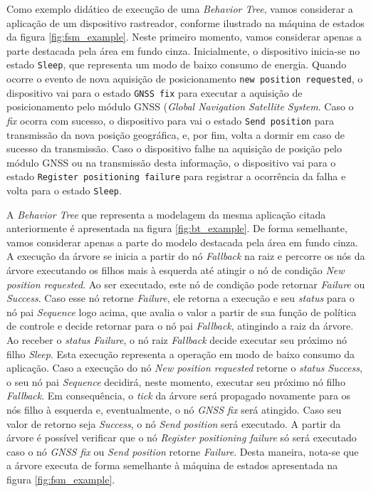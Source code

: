 \documentclass[conference]{IEEEtran}
\begin{document}
Como exemplo didático de execução de uma \textit{Behavior Tree}, vamos considerar a aplicação de um dispositivo rastreador, conforme ilustrado na máquina de estados da figura \ref{fig:fsm_example}.
Neste primeiro momento, vamos considerar apenas a parte destacada pela área em fundo cinza. Inicialmente, o dispositivo inicia-se no estado \texttt{Sleep}, que representa um modo de baixo consumo de energia.
Quando ocorre o evento de nova aquisição de posicionamento \texttt{new position requested}, o dispositivo vai para o estado \texttt{GNSS fix} para executar a aquisição de posicionamento pelo módulo GNSS (\textit{Global Navigation Satellite System}.
Caso o \textit{fix} ocorra com sucesso, o dispositivo para vai o estado \texttt{Send position} para transmissão da nova posição geográfica, e, por fim, volta a dormir em caso de sucesso da transmissão.
Caso o dispositivo falhe na aquisição de posição pelo módulo GNSS ou na transmissão desta informação, o dispositivo vai para o estado \texttt{Register positioning failure} para registrar a ocorrência da falha e volta para o estado \texttt{Sleep}.

A \textit{Behavior Tree} que representa a modelagem da mesma aplicação citada anteriormente é apresentada na figura \ref{fig:bt_example}.
De forma semelhante, vamos considerar apenas a parte do modelo destacada pela área em fundo cinza. A execução da árvore se inicia a partir do nó \textit{Fallback} na raiz e percorre os nós da árvore executando os filhos mais à esquerda até atingir o nó de condição \textit{New position requested}. Ao ser executado, este nó de condição pode retornar \textit{Failure} ou \textit{Success}.
Caso esse nó retorne \textit{Failure}, ele retorna a execução e seu \textit{status} para o nó pai \textit{Sequence} logo acima, que avalia o valor a partir de sua função de política de controle e decide retornar para o nó pai \textit{Fallback}, atingindo a raiz da árvore.
Ao receber o \textit{status} \textit{Failure}, o nó raiz \textit{Fallback} decide executar seu próximo nó filho \textit{Sleep}.
Esta execução representa a operação em modo de baixo consumo da aplicação.
Caso a execução do nó \textit{New position requested} retorne o \textit{status} \textit{Success}, o seu nó pai \textit{Sequence} decidirá, neste momento, executar seu próximo nó filho \textit{Fallback}.
Em consequência, o \textit{tick} da árvore será propagado novamente para os nós filho à esquerda e, eventualmente, o nó \textit{GNSS fix} será atingido.
Caso seu valor de retorno seja \textit{Success}, o nó \textit{Send position} será executado. A partir da árvore é possível verificar que o nó \textit{Register positioning failure} só será executado caso o nó \textit{GNSS fix} ou \textit{Send position} retorne \textit{Failure}. Desta maneira, nota-se que a árvore executa de forma semelhante à máquina de estados apresentada na figura \ref{fig:fsm_example}. 
\end{document}
